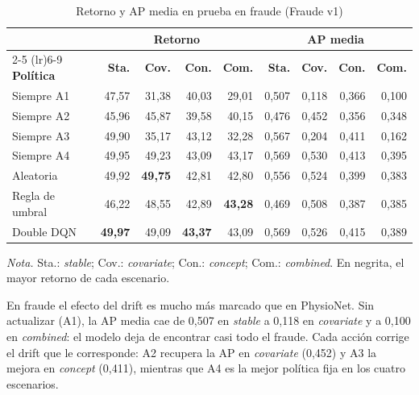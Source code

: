 \begin{table}[H]
    \centering
    \caption{Retorno y AP media en prueba en fraude (Fraude v1)}
    \label{tab:res_fraude}
    \small
    \begin{tabular}{lrrrrrrrr}
        \toprule
        & \multicolumn{4}{c}{\textbf{Retorno}} & \multicolumn{4}{c}{\textbf{AP media}} \\
        \cmidrule(lr){2-5} \cmidrule(lr){6-9}
        \textbf{Política} & \textbf{Sta.} & \textbf{Cov.} & \textbf{Con.} & \textbf{Com.}
                          & \textbf{Sta.} & \textbf{Cov.} & \textbf{Con.} & \textbf{Com.} \\
        \midrule
        Siempre A1      & 47,57 & 31,38 & 40,03 & 29,01 & 0,507 & 0,118 & 0,366 & 0,100 \\
        Siempre A2      & 45,96 & 45,87 & 39,58 & 40,15 & 0,476 & 0,452 & 0,356 & 0,348 \\
        Siempre A3      & 49,90 & 35,17 & 43,12 & 32,28 & 0,567 & 0,204 & 0,411 & 0,162 \\
        Siempre A4      & 49,95 & 49,23 & 43,09 & 43,17 & 0,569 & 0,530 & 0,413 & 0,395 \\
        Aleatoria       & 49,92 & \textbf{49,75} & 42,81 & 42,80 & 0,556 & 0,524 & 0,399 & 0,383 \\
        Regla de umbral & 46,22 & 48,55 & 42,89 & \textbf{43,28} & 0,469 & 0,508 & 0,387 & 0,385 \\
        Double DQN      & \textbf{49,97} & 49,09 & \textbf{43,37} & 43,09 & 0,569 & 0,526 & 0,415 & 0,389 \\
        \bottomrule
    \end{tabular}

    \vspace{1mm}
    \begin{minipage}{0.9\textwidth}
        \footnotesize
        \textit{Nota.} Sta.: \textit{stable}; Cov.: \textit{covariate}; Con.: \textit{concept};
        Com.: \textit{combined}. En negrita, el mayor retorno de cada escenario.
    \end{minipage}
\end{table}

En fraude el efecto del drift es mucho más marcado que en PhysioNet. Sin actualizar (A1), la AP
media cae de 0,507 en \textit{stable} a 0,118 en \textit{covariate} y a 0,100 en
\textit{combined}: el modelo deja de encontrar casi todo el fraude. Cada acción corrige el drift
que le corresponde: A2 recupera la AP en \textit{covariate} (0,452) y A3 la mejora en
\textit{concept} (0,411), mientras que A4 es la mejor política fija en los cuatro escenarios.

